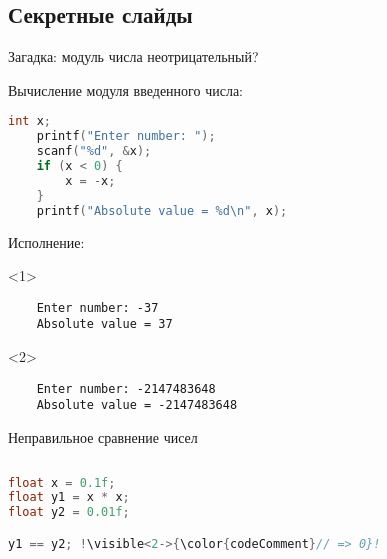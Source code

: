 



\begin{backup}


\section{Секретные слайды}


\begin{frame}[fragile]{Загадка: модуль числа неотрицательный?}

  \begin{block}{Вычисление модуля введенного числа:}
    \begin{lstlisting}[language=C]
    int x;
    printf("Enter number: ");
    scanf("%d", &x);
    if (x < 0) {
        x = -x;
    }
    printf("Absolute value = %d\n", x);
    \end{lstlisting}
  \end{block}

  \begin{block}{Исполнение:}
    \begin{onlyenv}<1>\begin{lstlisting}
    Enter number: -37
    Absolute value = 37
    \end{lstlisting}\end{onlyenv}
    \begin{onlyenv}<2>\begin{lstlisting}
    Enter number: -2147483648
    Absolute value = -2147483648
    \end{lstlisting}\end{onlyenv}
  \end{block}

\end{frame}


\begin{frame}[fragile]{Неправильное сравнение чисел}

  \begin{columns}[onlytextwidth,c]
    \begin{column}{0.6\textwidth}
      \begin{lstlisting}[language=C,escapechar=\!]
float x = 0.1f;
float y1 = x * x;
float y2 = 0.01f;

y1 == y2; !\visible<2->{\color{codeComment}// => 0}!
      \end{lstlisting}
    \end{column}


\end{columns}
\end{frame}
\end{backup}
